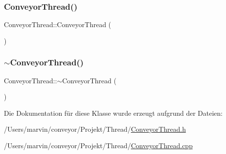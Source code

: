 \subsubsection{\texorpdfstring{Conveyor\+Thread()}{ConveyorThread()}}
{\footnotesize\ttfamily Conveyor\+Thread\+::\+Conveyor\+Thread (\begin{DoxyParamCaption}{ }\end{DoxyParamCaption})}

\hypertarget{class_conveyor_thread_ac496ae2a4708c7cd3af20721c1bf8b8a}{}\label{class_conveyor_thread_ac496ae2a4708c7cd3af20721c1bf8b8a} 
\subsubsection{\texorpdfstring{$\sim$\+Conveyor\+Thread()}{~ConveyorThread()}}
{\footnotesize\ttfamily Conveyor\+Thread\+::$\sim$\+Conveyor\+Thread (\begin{DoxyParamCaption}{ }\end{DoxyParamCaption})\hspace{0.3cm}{\ttfamily [virtual]}}



Die Dokumentation für diese Klasse wurde erzeugt aufgrund der Dateien\+:\begin{DoxyCompactItemize}
\item 
/\+Users/marvin/conveyor/\+Projekt/\+Thread/\hyperlink{_conveyor_thread_8h}{Conveyor\+Thread.\+h}\item 
/\+Users/marvin/conveyor/\+Projekt/\+Thread/\hyperlink{_conveyor_thread_8cpp}{Conveyor\+Thread.\+cpp}\end{DoxyCompactItemize}
